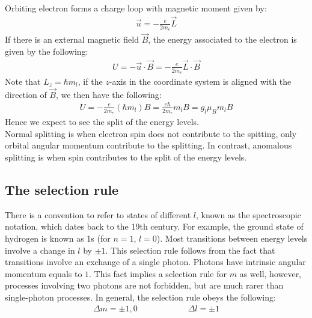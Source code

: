 \documentclass[11pt]{article}
\theoremstyle{break}
\theoremstyle{break}
\begin{document}
Orbiting electron forms a charge loop with magnetic moment given by:
\begin{align*}
\vec{u} = -\frac{e}{2m_e}\vec{L}
\end{align*}
If there is an external magnetic field $\vec{B}$, the energy associated to the electron is given by the following:
\begin{align*}
U = -\vec{u}\cdot \vec{B} = -\frac{e}{2m_e}\vec{L}\cdot \vec{B}
\end{align*}
Note that $L_z = \hbar m_l$, if the $z$-axis in the coordinate system is aligned with the direction of $\vec{B}$, we then have the following:
\begin{align*}
U = -\frac{e}{2m_e}(\hbar m_l)B = \frac{e\hbar}{2m_e}m_l B = g_l \mu_B m_l B
\end{align*}
Hence we expect to see the split of the energy levels.\\

Normal splitting is when electron spin does not contribute to the spitting, only orbital angular momentum  contribute to the splitting. In contrast, anomalous splitting is when spin contributes to the split of the energy levels. \\



\subsection{The selection rule}
There is a convention to refer to states of different $l$, known as the spectroscopic notation, which dates back to the 19th century. For example, the ground state of hydrogen is known as 1s (for $n=1$, $l=0$).
Most transitions between energy levels involve a change in $l$ by $\pm 1$. This selection rule follows from the fact that transitions involve an exchange of a single photon. Photons have intrinsic angular momentum equals to $1$. This fact implies a selection rule for $m$ as well, however, processes involving two photons are not forbidden, but are much rarer than single-photon processes. In general, the selection rule obeys the following:
\begin{align*}
\Delta m = \pm 1, 0 \qquad\qquad\qquad \Delta l = \pm 1
\end{align*}
\end{document}
